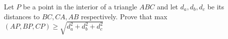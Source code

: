 Let $P$ be a point in the interior of a triangle $ABC$ and let $d_a,d_b,d_c$ be its distances to $BC,CA,AB$ respectively. Prove that  max $(AP, BP, CP) \ge \sqrt{d_a^2+d_b^2+d_c^2}$
